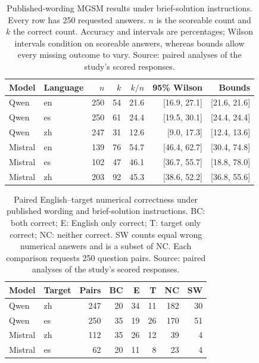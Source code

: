\begin{table}[ht]
\centering\small
\caption{Published-wording MGSM results under brief-solution instructions. Every row has 250 requested answers. $n$ is the scoreable count and $k$ the correct count. Accuracy and intervals are percentages; Wilson intervals condition on scoreable answers, whereas bounds allow every missing outcome to vary. Source: paired analyses of the study's scored responses.}
\begin{tabular}{llrrrrr}\toprule
Model & Language & $n$ & $k$ & $k/n$ & 95\% Wilson & Bounds\\\midrule
Qwen & en & 250 & 54 & 21.6 & [16.9, 27.1] & [21.6, 21.6]\\
Qwen & es & 250 & 61 & 24.4 & [19.5, 30.1] & [24.4, 24.4]\\
Qwen & zh & 247 & 31 & 12.6 & [9.0, 17.3] & [12.4, 13.6]\\
Mistral & en & 139 & 76 & 54.7 & [46.4, 62.7] & [30.4, 74.8]\\
Mistral & es & 102 & 47 & 46.1 & [36.7, 55.7] & [18.8, 78.0]\\
Mistral & zh & 203 & 92 & 45.3 & [38.6, 52.2] & [36.8, 55.6]\\
\bottomrule
\end{tabular}\label{tab:fresh-cells}
\end{table}
\begin{table}[ht]
\centering\small
\caption{Paired English--target numerical correctness under published wording and brief-solution instructions. BC: both correct; E: English only correct; T: target only correct; NC: neither correct. SW counts equal wrong numerical answers and is a subset of NC. Each comparison requests 250 question pairs. Source: paired analyses of the study's scored responses.}
\begin{tabular}{llrrrrrr}\toprule
Model & Target & Pairs & BC & E & T & NC & SW\\\midrule
Qwen & zh & 247 & 20 & 34 & 11 & 182 & 30\\
Qwen & es & 250 & 35 & 19 & 26 & 170 & 51\\
Mistral & zh & 112 & 35 & 26 & 12 & 39 & 4\\
Mistral & es & 62 & 20 & 11 & 8 & 23 & 4\\
\bottomrule
\end{tabular}\label{tab:fresh-pairs}
\end{table}
